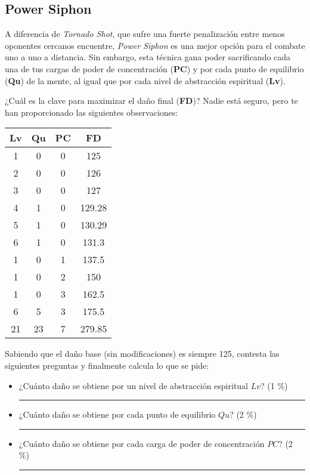 \documentclass[11pt]{article}
\newcommand{\veryshortresponserule}{{\large\rule{3 cm}{0.3mm}}}
\begin{document}
\pagebreak

\subsection{Power Siphon}

A diferencia de \textit{Tornado Shot}, que sufre una fuerte penalización entre menos oponentes cercanos encuentre, \textit{Power Siphon} es una mejor opción para el combate uno a uno a distancia.
Sin embargo, esta técnica gana poder sacrificando cada una de tus cargas de poder de concentración (\textbf{PC}) y por cada punto de equilibrio (\textbf{Qu}) de la mente, al igual que por cada nivel de abstracción espiritual (\textbf{Lv}).

¿Cuál es la clave para maximizar el daño final (\textbf{FD})? Nadie está seguro, pero te han proporcionado las siguientes observaciones:


\begin{table}[htbp]
    \footnotesize
    \centering
    \begin{tabular}{@{}cccc@{}}
    \toprule
    \textbf{Lv} & \textbf{Qu} & \textbf{PC}  & \textbf{FD} \\ \midrule
    1 & 0 & 0 & 125 \\
    2 & 0 & 0 & 126 \\
    3 & 0 & 0 & 127 \\
    4 & 1 & 0 & 129.28 \\
    5 & 1 & 0 & 130.29 \\
    6 & 1 & 0 & 131.3 \\
    \midrule
    1 & 0 & 1 & 137.5 \\
    1 & 0 & 2 & 150 \\
    1 & 0 & 3 & 162.5 \\
    6 & 5 & 3 & 175.5 \\
    21 & 23 & 7 & 279.85\\ \bottomrule
    \end{tabular}
\end{table}

Sabiendo que el daño base (sin modificaciones) es siempre 125, contesta las siguientes preguntas y finalmente calcula lo que se pide:

\begin{itemize}
    \item ¿Cuánto daño se obtiene por un nivel de abstracción espiritual $Lv$? (1 \%) \veryshortresponserule
    \item ¿Cuánto daño se obtiene por cada punto de equilibrio $Qu$? (2 \%) \veryshortresponserule
    \item ¿Cuánto daño se obtiene por cada carga de poder de concentración $PC$? (2 \%) \veryshortresponserule
\end{itemize}
\end{document}
